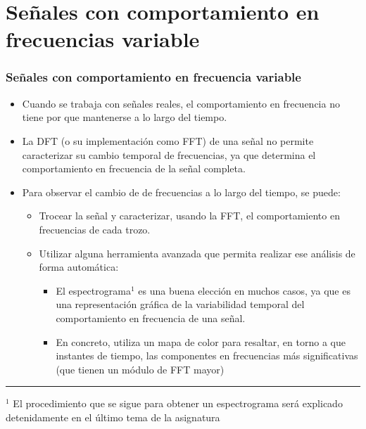 \section{Señales con comportamiento en frecuencias variable}

\begin{frame}
\frametitle{Señales con comportamiento en frecuencia variable}
  \vspace{-0.2cm}
  \footnotesize

  \begin{itemize}
    \item Cuando se trabaja con señales reales, el comportamiento en frecuencia no tiene por que mantenerse a lo largo del tiempo.
    \item La DFT (o su implementaci\'{o}n como FFT) de una señal no permite caracterizar su cambio temporal de frecuencias, ya que determina el comportamiento en frecuencia de la señal completa.
    \item Para observar el cambio de de frecuencias a lo largo del tiempo, se puede:
    \begin{itemize}
      \footnotesize
      \item Trocear la señal y caracterizar, usando la FFT, el comportamiento en frecuencias de cada trozo.
      \item Utilizar alguna herramienta avanzada que permita realizar ese an\'{a}lisis de forma autom\'{a}tica: 
      \begin{itemize}
        \item El \alert{espectrograma}$^{1}$ es una buena elecci\'{o}n en muchos casos, ya que es una representaci\'{o}n gr\'{a}fica de la variabilidad temporal del comportamiento en frecuencia de una señal. 
        \item En concreto, utiliza un mapa de color para resaltar, en torno a que instantes de tiempo, las componentes en frecuencias m\'{a}s significativas (que tienen un m\'{o}dulo de FFT mayor)
      \end{itemize}
    \end{itemize}
  \end{itemize}
  \vspace{-0.2cm}
  \rule{12cm}{0.4pt}
  \scriptsize
  $^{1}$ El procedimiento que se sigue para obtener un espectrograma ser\'{a} explicado detenidamente  en el \'{u}ltimo tema de la asignatura 
\end{frame}


